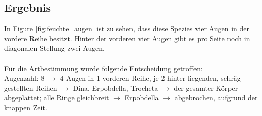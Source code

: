 \documentclass[oneside,10pt,a4paper]{report}
\begin{document}
			\subsection{Ergebnis}
				In Figure \ref{fig:feuchte_augen} ist zu sehen, dass diese Spezies vier Augen in der vordere Reihe besitzt. Hinter der vorderen vier Augen gibt es pro Seite noch in diagonalen Stellung zwei Augen.\\
				\\
				Für die Artbestimmung wurde folgende Entscheidung getroffen:\\
				Augenzahl: 8 $\rightarrow$ 4 Augen in 1 vorderen Reihe, je 2 hinter liegenden, schräg gestellten Reihen $\rightarrow$  Dina, Erpobdella, Trocheta $\rightarrow$ der gesamter Körper abgeplattet; alle Ringe gleichbreit $\rightarrow$  Erpobdella $\rightarrow$  abgebrochen, aufgrund der knappen Zeit.\\
\end{document}
